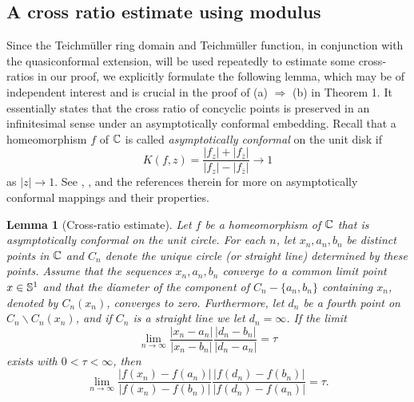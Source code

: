 \documentclass[11pt]{amsart}
\numberwithin{equation}{section}
\theoremstyle{plain}
\newtheorem{lem}{Lemma}
\theoremstyle{step}
\newcommand{\abs}[1]{\lvert#1\rvert}
\newcommand{\Ss}{\Bbb{S}^1}
\newcommand{\C}{\Bbb{C}}
\renewcommand{\bar}[1]{\overline{#1}}
\begin{document}
\subsection{A cross ratio estimate using modulus}
Since the Teichm\"uller ring domain and Teichm\"uller function, in conjunction with the quasiconformal extension, will be used repeatedly to estimate some cross-ratios in our proof, we explicitly formulate the following lemma, which may be of independent interest and is crucial in the proof of (a) $\Rightarrow$ (b) in Theorem 1. It essentially states that the cross ratio of concyclic points is preserved in an infinitesimal sense under an asymptotically conformal embedding. Recall that a homeomorphism $f$ of $\C$ is called {\it asymptotically conformal} on the unit disk if 
\[
K(f,z)=\frac{|f_z|+|f_{\bar{z}}|}{|f_z|-|f_{\bar{z}}|}\rightarrow 1
\]
as $|z|\rightarrow 1$. See \cite{gutlyanskii1995local}, \cite{MR1608159}, \cite[Section~11]{pommerenke2013boundary} and the references therein for more on asymptotically conformal mappings and their properties.

\begin{lem}[Cross-ratio estimate]\label{lem:Modulus_estimates}
Let $f$ be a homeomorphism of $\C$ that is asymptotically conformal on the unit circle. For each $n$, let $x_n,a_n,b_n$ be distinct points in $\C$ and $C_n$ denote the unique circle (or straight line) determined by these points. 
Assume that the sequences $x_n,a_n,b_n$ converge to a common limit point $x\in\Ss$ and that the diameter of the component of $C_n-\{a_n,b_n\}$ containing $x_n$, denoted by $C_n(x_n)$, converges to zero. Furthermore, let $d_n$ be a fourth point on $C_n\backslash C_n(x_n)$, and if $C_n$ is a straight line we let $d_n=\infty$.
If the limit 
\[
\lim_{n\to\infty}\frac{\abs{x_n-a_n}}{\abs{x_n-b_n}}\frac{\abs{d_n-b_n}}{\abs{d_n-a_n}}= \tau
\]
exists with $0<\tau<\infty$, then 
\[
\lim_{n\to\infty}\frac{\abs{f(x_n)-f(a_n)}}{\abs{f(x_n)-f(b_n)}}\frac{\abs{f(d_n)-f(b_n)}}{\abs{f(d_n)-f(a_n)}}= \tau.
\] 
\end{lem}
\end{document}
